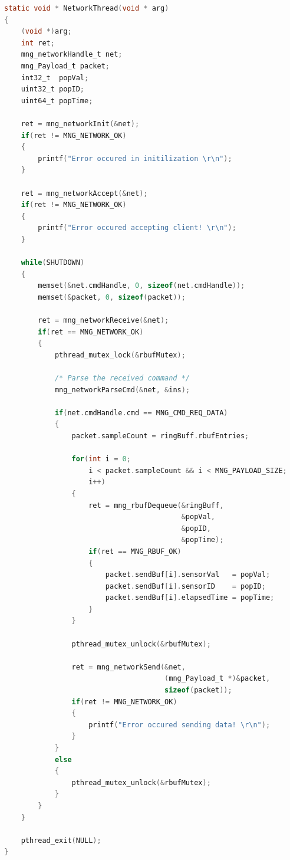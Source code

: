 \newpage
\begin{lstlisting}[language=C,
caption={Network Thread Implementation},
label={lst:network_thread}]
static void * NetworkThread(void * arg)
{
    (void *)arg;
    int ret;
    mng_networkHandle_t net;
    mng_Payload_t packet;
    int32_t  popVal;
    uint32_t popID;
    uint64_t popTime;

    ret = mng_networkInit(&net);
    if(ret != MNG_NETWORK_OK)
    {
        printf("Error occured in initilization \r\n");
    }

    ret = mng_networkAccept(&net);
    if(ret != MNG_NETWORK_OK)
    {
        printf("Error occured accepting client! \r\n");
    }

    while(SHUTDOWN)
    {
        memset(&net.cmdHandle, 0, sizeof(net.cmdHandle));
        memset(&packet, 0, sizeof(packet));

        ret = mng_networkReceive(&net);
        if(ret == MNG_NETWORK_OK)
        {
            pthread_mutex_lock(&rbufMutex);

            /* Parse the received command */
            mng_networkParseCmd(&net, &ins);

            if(net.cmdHandle.cmd == MNG_CMD_REQ_DATA)
            {
                packet.sampleCount = ringBuff.rbufEntries;

                for(int i = 0;
                    i < packet.sampleCount && i < MNG_PAYLOAD_SIZE;
                    i++)
                {
                    ret = mng_rbufDequeue(&ringBuff,
                                          &popVal,
                                          &popID,
                                          &popTime);
                    if(ret == MNG_RBUF_OK)
                    {
                        packet.sendBuf[i].sensorVal   = popVal;
                        packet.sendBuf[i].sensorID    = popID;
                        packet.sendBuf[i].elapsedTime = popTime;
                    }
                }

                pthread_mutex_unlock(&rbufMutex);

                ret = mng_networkSend(&net,
                                      (mng_Payload_t *)&packet,
                                      sizeof(packet));
                if(ret != MNG_NETWORK_OK)
                {
                    printf("Error occured sending data! \r\n");
                }
            }
            else
            {
                pthread_mutex_unlock(&rbufMutex);
            }
        }
    }

    pthread_exit(NULL);
}
\end{lstlisting}



